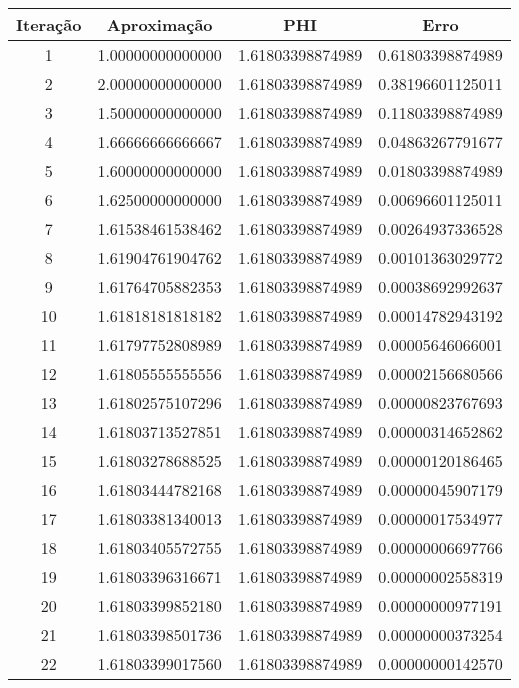 \begin{table}[H]
\centering 
\begin{tabular}{|c|c|c|c|}
\hline 
Iteração & Aproximação &  PHI & Erro \\ 
\hline 
1 & 1.00000000000000 &  1.61803398874989 & 0.61803398874989 \\ 
\hline
2 & 2.00000000000000 &  1.61803398874989 & 0.38196601125011 \\ 
\hline
3 & 1.50000000000000 &  1.61803398874989 & 0.11803398874989 \\ 
\hline
4 & 1.66666666666667 &  1.61803398874989 & 0.04863267791677 \\ 
\hline
5 & 1.60000000000000 &  1.61803398874989 & 0.01803398874989 \\ 
\hline
6 & 1.62500000000000 &  1.61803398874989 & 0.00696601125011 \\ 
\hline
7 & 1.61538461538462 &  1.61803398874989 & 0.00264937336528 \\ 
\hline
8 & 1.61904761904762 &  1.61803398874989 & 0.00101363029772 \\ 
\hline
9 & 1.61764705882353 &  1.61803398874989 & 0.00038692992637 \\ 
\hline
10 & 1.61818181818182 &  1.61803398874989 & 0.00014782943192 \\ 
\hline
11 & 1.61797752808989 &  1.61803398874989 & 0.00005646066001 \\ 
\hline
12 & 1.61805555555556 &  1.61803398874989 & 0.00002156680566 \\ 
\hline
13 & 1.61802575107296 &  1.61803398874989 & 0.00000823767693 \\ 
\hline
14 & 1.61803713527851 &  1.61803398874989 & 0.00000314652862 \\ 
\hline
15 & 1.61803278688525 &  1.61803398874989 & 0.00000120186465 \\ 
\hline
16 & 1.61803444782168 &  1.61803398874989 & 0.00000045907179 \\ 
\hline
17 & 1.61803381340013 &  1.61803398874989 & 0.00000017534977 \\ 
\hline
18 & 1.61803405572755 &  1.61803398874989 & 0.00000006697766 \\ 
\hline
19 & 1.61803396316671 &  1.61803398874989 & 0.00000002558319 \\ 
\hline
20 & 1.61803399852180 &  1.61803398874989 & 0.00000000977191 \\ 
\hline
21 & 1.61803398501736 &  1.61803398874989 & 0.00000000373254 \\ 
\hline
22 & 1.61803399017560 &  1.61803398874989 & 0.00000000142570 \\ 

\end{tabular}
\end{table}
